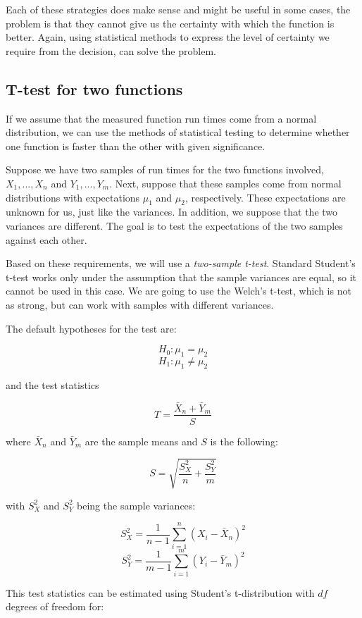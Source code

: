 Each of these strategies does make sense and might be useful in some cases, the problem is that they cannot give us the certainty with which the function is better. Again, using statistical methods to express the level of certainty we require from the decision, can solve the problem.

\subsection{T-test for two functions}
\label{subsec:t_test_two}

If we assume that the measured function run times come from a normal distribution, we can use the methods of statistical testing to determine whether one function is faster than the other with given significance. 

Suppose we have two samples of run times for the two functions involved, $X_1, ..., X_n$ and $Y_1, ..., Y_m$. Next, suppose that these samples come from normal distributions with expectations $\mu_1$ and $\mu_2$, respectively. These expectations are unknown for us, just like the variances. In addition, we suppose that the two variances are different. The goal is to test the expectations of the two samples against each other.

Based on these requirements, we will use a \textit{two-sample t-test}. Standard Student's t-test works only under the assumption that the sample variances are equal, so it cannot be used in this case. We are going to use the Welch's t-test, which is not as strong, but can work with samples with different variances.

The default hypotheses for the test are:

\[
H_0: \mu_1 = \mu_2
\]
\[
H_1: \mu_1 \ne  \mu_2
\]

and the test statistics

\[
T = \frac{\bar{X}_n + \bar{Y}_m}{S}
\]

where $\bar{X}_n$ and $\bar{Y}_m$ are the sample means and $S$ is the following:

\[
S = \sqrt{\frac{S_X^2}{n} + \frac{S_Y^2}{m}}
\]

with $S_X^2$ and $S_Y^2$ being the sample variances:

\[
S_X^2 = \frac{1}{n-1} \sum_{i=1}^{n}(X_i - \bar{X}_n)^2
\]
\[
S_Y^2 = \frac{1}{m-1} \sum_{i=1}^{m}(Y_i - \bar{Y}_m)^2
\]

This test statistics can be estimated using Student's t-distribution with $df$ degrees of freedom for:

